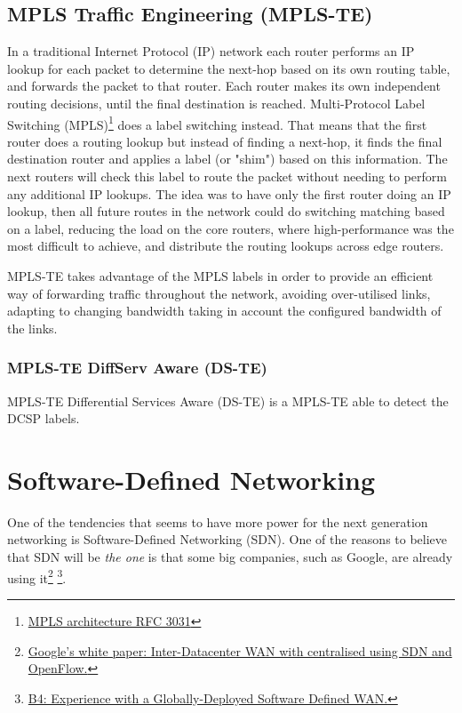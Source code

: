 \subsection{MPLS Traffic Engineering (MPLS-TE)}
\label{sec:mpls-te}
In a traditional Internet Protocol (IP) network each router performs an IP lookup for each packet to determine the next-hop based on its own routing table, and forwards the packet to that router. Each router makes its own independent routing decisions, until the final destination is reached.
Multi-Protocol Label Switching (MPLS)\footnote{\href{http://www.ietf.org/rfc/rfc3031.txt}{MPLS architecture RFC 3031}} does a label switching instead. That means that the first router does a routing lookup but instead of finding a next-hop, it finds the final destination router and applies a label (or "shim") based on this information. The next routers will check this label to route the packet without needing to perform any additional IP lookups. The idea was to have only the first router doing an IP lookup, then all future routes in the network could do switching matching based on a label, reducing the load on the core routers, where high-performance was the most difficult to achieve, and distribute the routing lookups across edge routers.

MPLS-TE takes advantage of the MPLS labels in order to provide an efficient way of forwarding traffic throughout the network, avoiding over-utilised links, adapting to changing bandwidth taking in account the configured bandwidth of the links.

\subsubsection{MPLS-TE DiffServ Aware (DS-TE)}

MPLS-TE Differential Services Aware (DS-TE) is a MPLS-TE able to detect the DCSP labels.



\section{Software-Defined Networking}
\label{sec:sdn}

One of the tendencies that seems to have more power for the next generation networking is Software-Defined Networking (SDN). One of the reasons to believe that SDN will be \emph{the one} is that some big companies, such as Google, are already using it\footnote{\href{http://goo.gl/F6sBR}{Google's white paper: Inter-Datacenter WAN with centralised using SDN and OpenFlow.}} \footnote{\href{http://cseweb.ucsd.edu/~vahdat/papers/b4-sigcomm13.pdf}{B4: Experience with a Globally-Deployed Software Defined WAN.}}.\\

